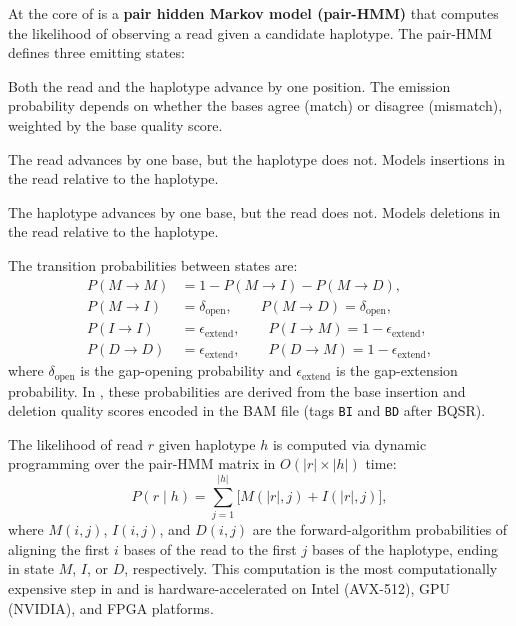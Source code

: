 At the core of  is a \textbf{pair hidden Markov model (pair-HMM)} that computes the likelihood of observing a read given a candidate haplotype. The pair-HMM defines three emitting states:

\begin{description}[nosep]
  \item[Match / Mismatch (M)] Both the read and the haplotype advance by one position. The emission probability depends on whether the bases agree (match) or disagree (mismatch), weighted by the base quality score.
  \item[Insertion (I)] The read advances by one base, but the haplotype does not. Models insertions in the read relative to the haplotype.
  \item[Deletion (D)] The haplotype advances by one base, but the read does not. Models deletions in the read relative to the haplotype.
\end{description}

The transition probabilities between states are:
\begin{align}
\label{eq:variants:pairhmm_transitions}
P(M \to M) &= 1 - P(M \to I) - P(M \to D), \nonumber \\
P(M \to I) &= \delta_{\text{open}}, \qquad P(M \to D) = \delta_{\text{open}}, \nonumber \\
P(I \to I) &= \epsilon_{\text{extend}}, \qquad P(I \to M) = 1 - \epsilon_{\text{extend}}, \\
P(D \to D) &= \epsilon_{\text{extend}}, \qquad P(D \to M) = 1 - \epsilon_{\text{extend}}, \nonumber
\end{align}
where $\delta_{\text{open}}$ is the gap-opening probability and $\epsilon_{\text{extend}}$ is the gap-extension probability. In , these probabilities are derived from the base insertion and deletion quality scores encoded in the BAM file (tags \texttt{BI} and \texttt{BD} after BQSR).

The likelihood of read $r$ given haplotype $h$ is computed via dynamic programming over the pair-HMM matrix in $O(|r| \times |h|)$ time:
\begin{equation}
\label{eq:variants:read_haplotype_likelihood}
P(r \mid h) = \sum_{j=1}^{|h|} \bigl[ M(|r|, j) + I(|r|, j) \bigr],
\end{equation}
where $M(i,j)$, $I(i,j)$, and $D(i,j)$ are the forward-algorithm probabilities of aligning the first $i$ bases of the read to the first $j$ bases of the haplotype, ending in state $M$, $I$, or $D$, respectively. This computation is the most computationally expensive step in  and is hardware-accelerated on Intel (AVX-512), GPU (NVIDIA), and FPGA platforms.

